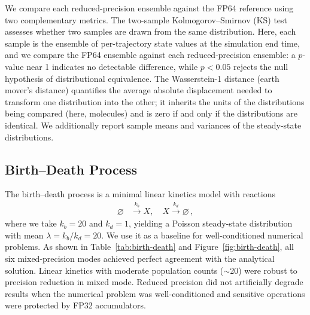 \documentclass{article}
\begin{document}
We compare each reduced-precision ensemble against the FP64 reference using two complementary metrics. The two-sample Kolmogorov--Smirnov (KS) test \cite{kolmogorov1933,smirnov1948} assesses whether two samples are drawn from the same distribution. Here, each sample is the ensemble of per-trajectory state values at the simulation end time, and we compare the FP64 ensemble against each reduced-precision ensemble: a $p$-value near 1 indicates no detectable difference, while $p < 0.05$ rejects the null hypothesis of distributional equivalence. The Wasserstein-1 distance (earth mover's distance) \cite{vaserstein1969,villani2009} quantifies the average absolute displacement needed to transform one distribution into the other; it inherits the units of the distributions being compared (here, molecules) and is zero if and only if the distributions are identical. We additionally report sample means and variances of the steady-state distributions.

\subsection{Birth--Death Process}

The birth--death process \cite{gillespie1977} is a minimal linear kinetics model with reactions
\begin{align*}
    \varnothing &\xrightarrow{k_b} X, \quad X \xrightarrow{k_d} \varnothing \, ,
\end{align*}
where we take $k_b = 20$ and $k_d = 1$, yielding a Poisson steady-state distribution with mean $\lambda = k_b/k_d = 20$. We use it as a baseline for well-conditioned numerical problems. As shown in Table~\ref{tab:birth-death} and Figure~\ref{fig:birth-death}, all six mixed-precision modes achieved perfect agreement with the analytical solution. Linear kinetics with moderate population counts ($\sim$20) were robust to precision reduction in mixed mode. Reduced precision did not artificially degrade results when the numerical problem was well-conditioned and sensitive operations were protected by FP32 accumulators.
\end{document}
